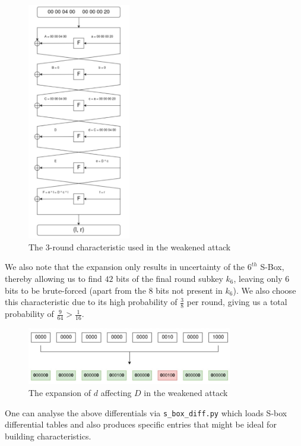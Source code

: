 \documentclass[12pt]{article}
\begin{document}
\begin{figure}[!h]
  \centering
  \includegraphics[width=0.4\textwidth]{char2.png}
  \caption{The 3-round characteristic used in the weakened attack}
  \label{fig:char2}
\end{figure}

We also note that the expansion only results in uncertainty of the $6^{th}$ S-Box, thereby allowing us to find $42$ bits of the final round subkey $k_6$, leaving only $6$ bits to be brute-forced (apart from the $8$ bits not present in $k_6$). We also choose this characteristic due to its high probability of $\frac{3}{8}$ per round, giving us a total probability of $\frac{9}{64} > \frac{1}{16}$.

\begin{figure}[!h]
  \centering
  \includegraphics[width=0.8\textwidth]{char2_exp.png}
  \caption{The expansion of $d$ affecting $D$ in the weakened attack}
  \label{fig:exp2}
\end{figure}

One can analyse the above differentials via \texttt{s\_box\_diff.py} which loads S-box differential tables and also produces specific entries that might be ideal for building characteristics.
\end{document}
